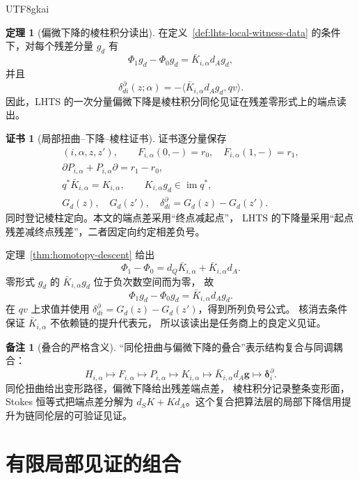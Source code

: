 \documentclass[12pt]{report}
\makeatletter
\theoremstyle{definition}
\newtheorem{theorem}{定理}[chapter]
\newtheorem{remark}{备注}[chapter]
\newtheorem{Certificate}{证书}[chapter]
\renewenvironment{proof}[1][\proofname]{\par
  \pushQED{\qed}\normalfont
  \topsep6\p@\@plus6\p@\relax
  \trivlist
  \item[\hskip\labelsep\normalfont #1\@addpunct{.}]\ignorespaces
}{
  \popQED\endtrivlist\@endpefalse
}
\newcommand{\im}{\operatorname{im}}
\makeatother
\begin{document}
\begin{CJK*}{UTF8}{gkai}
\begin{theorem}[偏微下降的棱柱积分读出]
\label{thm:lhts-partial-descent-prism-readout}
在定义~\ref{def:lhts-local-witness-data} 的条件下，对每个残差分量 \(g_d\) 有
\[
\Phi_1g_d-\Phi_0g_d
=\bar K_{i,\alpha}d_Ag_d,
\]
并且
\[
\boxed{
\delta_{di}^{\partial}(z;\alpha)
=
-\bigl\langle
\bar K_{i,\alpha}d_Ag_d,qv
\bigr\rangle.}
\]
因此，LHTS 的一次分量偏微下降是棱柱积分同伦见证在残差零形式上的端点读出。
\end{theorem}

\begin{Certificate}[局部扭曲--下降--棱柱证书]
\label{cert:lhts-prism-local}
证书逐分量保存
\[
\begin{gathered}
(i,\alpha,z,z'),\qquad
F_{i,\alpha}(0,-)=r_0,\quad F_{i,\alpha}(1,-)=r_1,\\
\partial P_{i,\alpha}+P_{i,\alpha}\partial=r_1-r_0,\\
q^*\bar K_{i,\alpha}=K_{i,\alpha},\qquad
K_{i,\alpha}g_d\in\im q^*,\\
G_d(z),\quad G_d(z'),\quad
\delta_{di}^{\partial}=G_d(z)-G_d(z').
\end{gathered}
\]
同时登记棱柱定向。本文的端点差采用“终点减起点”，
LHTS 的下降量采用“起点残差减终点残差”，二者因定向约定相差负号。
\end{Certificate}

\begin{proof}
定理~\ref{thm:homotopy-descent} 给出
\[
\Phi_1-\Phi_0=d_Q\bar K_{i,\alpha}+\bar K_{i,\alpha}d_A.
\]
零形式 \(g_d\) 的 \(\bar K_{i,\alpha}g_d\) 位于负次数空间而为零，
故
\[
\Phi_1g_d-\Phi_0g_d=\bar K_{i,\alpha}d_Ag_d.
\]
在 \(qv\) 上求值并使用
\(\delta_{di}^\partial=G_d(z)-G_d(z')\)，得到所列负号公式。
核消去条件保证 \(\bar K_{i,\alpha}\) 不依赖链的提升代表元，
所以该读出是任务商上的良定义见证。
\end{proof}

\begin{remark}[叠合的严格含义]
\label{rem:twist-descent-superposition}
“同伦扭曲与偏微下降的叠合”表示结构复合与同调耦合：
\[
H_{i,\alpha}
\longmapsto F_{i,\alpha}
\longmapsto P_{i,\alpha}
\longmapsto K_{i,\alpha}
\longmapsto
\bar K_{i,\alpha}d_A\mathbf g
\longmapsto
\boldsymbol\delta_i^\partial.
\]
同伦扭曲给出变形路径，偏微下降给出残差端点差，
棱柱积分记录整条变形面，Stokes 恒等式把端点差分解为
\(d_SK+Kd_A\)。这个复合把算法层的局部下降信用提升为链同伦层的可验证见证。
\end{remark}

\section{有限局部见证的组合}


\end{CJK*}
\end{document}
